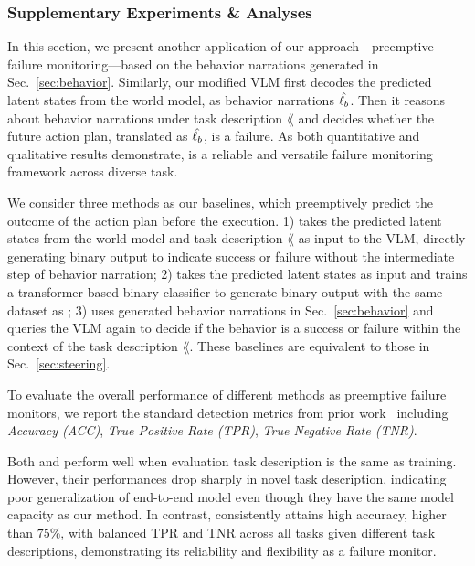 \subsubsection{Supplementary Experiments \& Analyses}\hfill 
\label{sec:appendix_sup_exp_ana}



 In this section, we present another application of our approach—preemptive failure monitoring—based on the behavior narrations generated in Sec.~\ref{sec:behavior}. Similarly, our modified VLM first decodes the predicted latent states from the world model, as behavior narrations $\hat{\ell_b}$. Then it reasons about behavior narrations under task description $\lang$ and decides whether the future action plan, translated as $\hat{\ell_b}$, is a failure. As both quantitative and qualitative results demonstrate,  \ours is a reliable and versatile failure monitoring framework across diverse task.

 We consider three methods as our baselines, which preemptively predict the outcome of the action plan before the execution. 1) \vlmdynlatentbin takes the predicted latent states from the world model and task description $\lang$ as input to the VLM, directly generating binary output to indicate success or failure without the intermediate step of behavior narration; 2) \classdynlatent takes the predicted latent states as input and trains a transformer-based binary classifier to generate binary output with the same dataset as \vlmdynlatentbin; 3) \vlmact uses generated behavior narrations in Sec.~\ref{sec:behavior} and queries the VLM again to decide if the behavior is a success or failure within the context of the task description $\lang$. These baselines are equivalent to those in Sec.~\ref{sec:steering}.

To evaluate the overall performance of different methods as preemptive failure monitors, we report the standard detection metrics from prior work~\citep{agiaunpacking} including \textit{Accuracy (ACC)}, \textit{True Positive Rate (TPR)}, \textit{True Negative Rate (TNR)}.

 Both \vlmdynlatentbin and \classdynlatent perform well when evaluation task description is the same as training. However, their performances drop sharply in novel task description, indicating poor generalization of end-to-end model even though they have the same model capacity as our method.  In contrast, \ours consistently attains high accuracy, higher than $75\%$, with balanced TPR and TNR across all tasks given different task descriptions, demonstrating its reliability and flexibility as a failure monitor.

